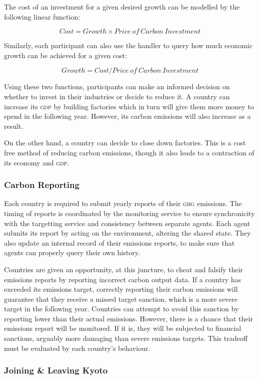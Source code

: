 The cost of an investment for a given desired growth can be modelled by the following linear function:

$$
Cost = Growth \times Price~of~Carbon~Investment
$$

Similarly, each participant can also use the handler to query how much economic growth can be achieved for a given cost:

$$
Growth = Cost / Price~of~Carbon~Investment
$$

Using these two functions, participants can make an informed decision on whether to invest in their industries or decide to reduce it. A country can increase its \textsc{gdp} by building factories which in turn will give them more money to spend in the following year. However, its carbon emissions will also increase as a result.

On the other hand, a country can decide to close down factories. This is a cost free method of reducing carbon emissions, though it also leads to a contraction of its economy and \textsc{gdp}. 

\subsubsection{Carbon Reporting}

Each country is required to submit yearly reports of their \textsc{ghg} emissions. The timing of reports is coordinated by the monitoring service to ensure synchronicity with the targetting service and consistency between separate agents. Each agent submits its report by acting on the environment, altering the shared state. They also update an internal record of their emissions reports, to make sure that agents can properly query their own history.

Countries are given an opportunity, at this juncture, to cheat and falsify their emissions reports by reporting incorrect carbon output data. If a country has exceeded its emissions target, correctly reporting their carbon emissions will guarantee that they receive a missed target sanction, which is a more severe target in the following year. Countries can attempt to avoid this sanction by reporting lower than their actual emissions. However, there is a chance that their emissions report will be monitored. If it is, they will be subjected to financial sanctions, arguably more damaging than severe emissions targets. This tradeoff must be evaluated by each country's behaviour.

\subsubsection{Joining \& Leaving Kyoto}

